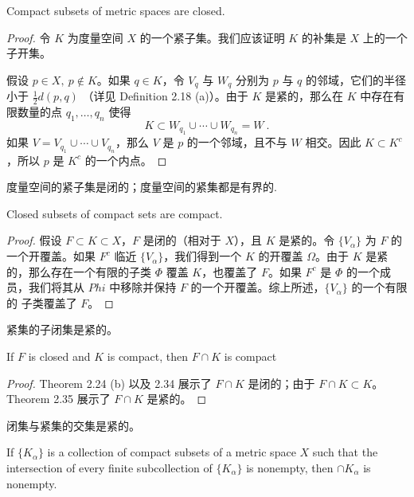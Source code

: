 \documentclass[../poma-notes.tex]{subfiles}
\begin{document}
\begin{theorem}
  Compact subsets of metric spaces are closed.
\end{theorem}

\begin{proof}
  令 $K$ 为度量空间 $X$ 的一个紧子集。我们应该证明 $K$ 的补集是 $X$ 上的一个子开集。

  假设 $p \in X,\ p \notin K$。如果 $q \in K$，令 $V_q$ 与 $W_q$ 分别为 $p$ 与 $q$ 的邻域，它们的半径小于 $\frac{1}{2}d(p,q)$
  （详见 Definition 2.18 (a)）。由于 $K$ 是紧的，那么在 $K$ 中存在有限数量的点 $q_1,\dots,q_n$ 使得
  \[K \subset W_{q_1} \cup \cdots \cup W_{q_n} = W\ .\]
  如果 $V = V_{q_1} \cup \cdots \cup V_{q_n}$，那么 $V$ 是 $p$ 的一个邻域，且不与 $W$ 相交。因此 $K \subset K^c$，所以 $p$ 是
  $K^c$ 的一个内点。
\end{proof}

\anote 度量空间的紧子集是闭的；度量空间的紧集都是有界的.

\begin{theorem}
  Closed subsets of compact sets are compact.
\end{theorem}

\begin{proof}
  假设 $F \subset K \subset X$，$F$ 是闭的（相对于 $X$），且 $K$ 是紧的。令 $\{V_{\alpha}\}$ 为 $F$ 的一个开覆盖。如果 $F^c$
  临近 $\{V_{\alpha}\}$，我们得到一个 $K$ 的开覆盖 $\Omega$。由于 $K$ 是紧的，那么存在一个有限的子类 $\Phi$ 覆盖 $K$，也覆盖了
  $F$。如果 $F^c$ 是 $\Phi$ 的一个成员，我们将其从 $Phi$ 中移除并保持 $F$ 的一个开覆盖。综上所述，$\{V_{\alpha}\}$ 的一个有限的
  子类覆盖了 $F$。
\end{proof}

\anote 紧集的子闭集是紧的。

\begin{corollary}
  If $F$ is closed and $K$ is compact, then $F \cap K$ is compact
\end{corollary}

\begin{proof}
  Theorem 2.24 (b) 以及 2.34 展示了 $F \cap K$ 是闭的；由于 $F \cap K \subset K$。Theorem 2.35 展示了 $F \cap K$ 是紧的。
\end{proof}

\anote 闭集与紧集的交集是紧的。

\begin{theorem}
  If $\{K_{\alpha}\}$ is a collection of compact subsets of a metric space $X$ such that the intersection of every finite
  subcollection of $\{K_{\alpha}\}$ is nonempty, then $\cap K_{\alpha}$ is nonempty.
\end{theorem}
\end{document}
